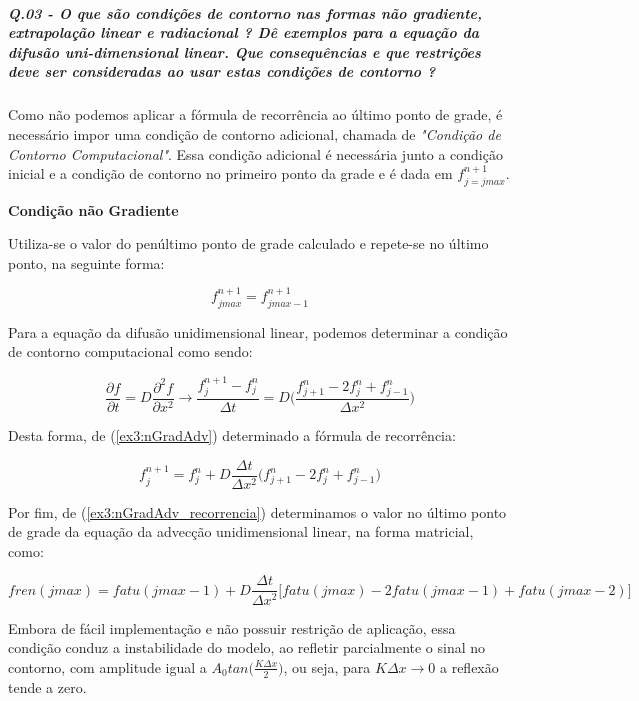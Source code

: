 \documentclass[11pt]{article}
\begin{document}
    \subparagraph{Q.03 - O que são condições de contorno nas formas não
gradiente, extrapolação linear e radiacional ? Dê exemplos para a
equação da difusão uni-dimensional linear. Que consequências e que
restrições deve ser consideradas ao usar estas condições de contorno
?}

Como não podemos aplicar a fórmula de recorrência ao último ponto de
grade, é necessário impor uma condição de contorno adicional, chamada de
\emph{"Condição de Contorno Computacional"}. Essa condição adicional é
necessária junto a condição inicial e a condição de contorno no primeiro
ponto da grade e é dada em \(f^{n+1}_{j=jmax}\).



\textbf{Condição não Gradiente}

Utiliza-se o valor do penúltimo ponto de grade calculado e repete-se no
último ponto, na seguinte forma:

\begin{equation}
    f^{n+1}_{jmax} = f^{n+1}_{jmax-1}
\end{equation}

Para a equação da difusão unidimensional linear, podemos determinar a
condição de contorno computacional como sendo:

\begin{equation}
    \frac{\partial{f}}{\partial{t}} = D\frac{\partial^2{f}}{\partial{x^2}} \longrightarrow \frac{f^{n+1}_{j} - f^{n}_{j}}{\Delta{t}} = D\bigg( \frac{f^{n}_{j+1} -2f^{n}_{j} + f^{n}_{j-1}}{\Delta{x^2}} \bigg)
    \label{ex3:nGradAdv}
\end{equation}

Desta forma, de (\ref{ex3:nGradAdv}) determinado a fórmula de
recorrência:

\begin{equation}
    f^{n+1}_{j} = f^{n}_{j} + D\frac{\Delta{t}}{\Delta{x^2}}\bigg( f^{n}_{j+1} -2f^{n}_{j} + f^{n}_{j-1} \bigg)
    \label{ex3:nGradAdv_recorrencia}
\end{equation}

Por fim, de (\ref{ex3:nGradAdv_recorrencia}) determinamos o valor no
último ponto de grade da equação da advecção unidimensional linear, na
forma matricial, como:

\begin{equation}
    fren(jmax) = fatu(jmax-1) + D\frac{\Delta{t}}{\Delta{x^2}}\biggr[fatu(jmax) -2fatu(jmax-1) +fatu(jmax-2) \biggr]
\end{equation}

Embora de fácil implementação e não possuir restrição de aplicação, essa
condição conduz a instabilidade do modelo, ao refletir parcialmente o
sinal no contorno, com amplitude igual a
\(A_0tan\bigg( \frac{K\Delta{x}}{2} \bigg)\), ou seja, para
\(K\Delta{x} \longrightarrow 0\) a reflexão tende a zero.
\end{document}
